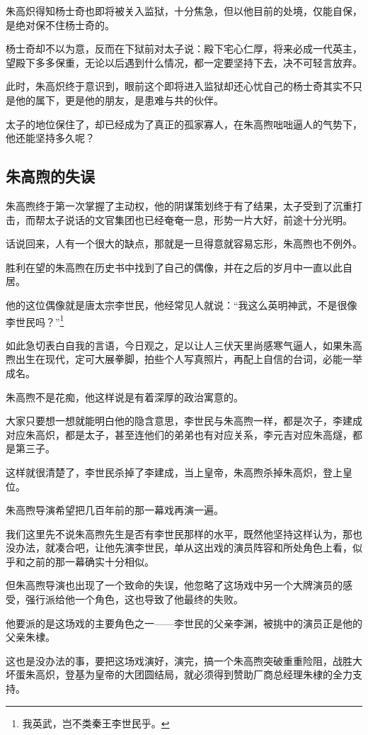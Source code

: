 \begin{multicols}{\theparacolNo}
朱高炽得知杨士奇也即将被关入监狱，十分焦急，但以他目前的处境，仅能自保，是绝对保不住杨士奇的。

杨士奇却不以为意，反而在下狱前对太子说：殿下宅心仁厚，将来必成一代英主，望殿下多多保重，无论以后遇到什么情况，都一定要坚持下去，决不可轻言放弃。

此时，朱高炽终于意识到，眼前这个即将进入监狱却还心忧自己的杨士奇其实不只是他的属下，更是他的朋友，是患难与共的伙伴。

太子的地位保住了，却已经成为了真正的孤家寡人，在朱高煦咄咄逼人的气势下，他还能坚持多久呢？

\subsection{朱高煦的失误}
朱高煦终于第一次掌握了主动权，他的阴谋策划终于有了结果，太子受到了沉重打击，而帮太子说话的文官集团也已经奄奄一息，形势一片大好，前途十分光明。

话说回来，人有一个很大的缺点，那就是一旦得意就容易忘形，朱高煦也不例外。

胜利在望的朱高煦在历史书中找到了自己的偶像，并在之后的岁月中一直以此自居。

他的这位偶像就是唐太宗李世民，他经常见人就说：“我这么英明神武，不是很像李世民吗？”\footnote{我英武，岂不类秦王李世民乎。}

如此急切表白自我的言语，今日观之，足以让人三伏天里尚感寒气逼人，如果朱高煦出生在现代，定可大展拳脚，拍些个人写真照片，再配上自信的台词，必能一举成名。

朱高煦不是花痴，他这样说是有着深厚的政治寓意的。

大家只要想一想就能明白他的隐含意思，李世民与朱高煦一样，都是次子，李建成对应朱高炽，都是太子，甚至连他们的弟弟也有对应关系，李元吉对应朱高燧，都是第三子。

这样就很清楚了，李世民杀掉了李建成，当上皇帝，朱高煦杀掉朱高炽，登上皇位。

朱高煦导演希望把几百年前的那一幕戏再演一遍。

我们这里先不说朱高煦先生是否有李世民那样的水平，既然他坚持这样认为，那也没办法，就凑合吧，让他先演李世民，单从这出戏的演员阵容和所处角色上看，似乎和之前的那一幕确实十分相似。

但朱高煦导演也出现了一个致命的失误，他忽略了这场戏中另一个大牌演员的感受，强行派给他一个角色，这也导致了他最终的失败。

他要派的是这场戏的主要角色之一——李世民的父亲李渊，被挑中的演员正是他的父亲朱棣。

这也是没办法的事，要把这场戏演好，演完，搞一个朱高煦突破重重险阻，战胜大坏蛋朱高炽，登基为皇帝的大团圆结局，就必须得到赞助厂商总经理朱棣的全力支持。


\end{multicols}
